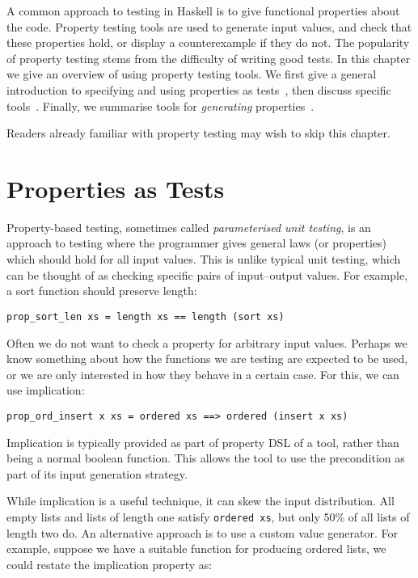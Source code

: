 A common approach to testing in Haskell is to give functional
properties about the code.  Property testing tools are used to
generate input values, and check that these properties hold, or
display a counterexample if they do not.  The popularity of property
testing stems from the difficulty of writing good tests.  In this
chapter we give an overview of using property testing tools.  We first
give a general introduction to specifying and using properties as
tests~, then discuss specific
tools~.  Finally, we summarise tools for
\emph{generating} properties~.

Readers already familiar with property testing may wish to skip this
chapter.

\section{Properties as Tests}
\label{sec:property_testing-intro}

Property-based testing\cite{claessen2000}, sometimes called \emph{parameterised
  unit testing}, is an approach to testing where the programmer gives general
laws (or properties) which should hold for all input values.  This is unlike
typical unit testing, which can be thought of as checking specific pairs of
input--output values.  For example, a sort function should preserve length:

\begin{verbatim}
prop_sort_len xs = length xs == length (sort xs)
\end{verbatim}

Often we do not want to check a property for arbitrary input values.
Perhaps we know something about how the functions we are testing are
expected to be used, or we are only interested in how they behave in a
certain case.  For this, we can use implication:

\begin{verbatim}
prop_ord_insert x xs = ordered xs ==> ordered (insert x xs)
\end{verbatim}

Implication is typically provided as part of property DSL of a tool,
rather than being a normal boolean function.  This allows the tool to
use the precondition as part of its input generation strategy.

While implication is a useful technique, it can skew the input distribution.
All empty lists and lists of length one satisfy \verb|ordered xs|, but only 50\%
of all lists of length two do.  An alternative approach is to use a custom value
generator.  For example, suppose we have a suitable function for producing
ordered lists, we could restate the implication property as:

